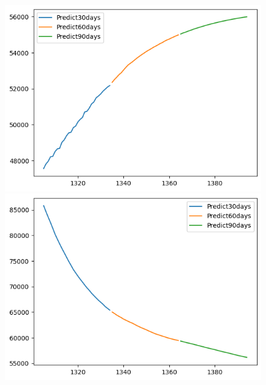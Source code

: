 \begin{figure}[H]
\begin{minipage}{0.15\textwidth}
    \end{minipage}
    \hfill
        \begin{minipage}{0.15\textwidth}
    \centering
    \includegraphics[width=1\textwidth]{resources/chapter-5/newdata1/predicted/BIDV_ RNN_9-1_30days.png}
    \end{minipage}
    \hfill
    \begin{minipage}{0.15\textwidth}
    \centering
    \includegraphics[width=1\textwidth]{resources/chapter-5/newdata1/predicted/VCB_ RNN_7-3_30days.png}
    \end{minipage}
    \hfill
    \begin{minipage}{0.15\textwidth}
    \centering

\end{minipage}
\end{figure}
